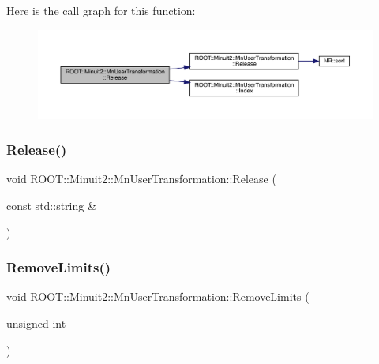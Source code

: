 Here is the call graph for this function\+:\nopagebreak
\begin{figure}[H]
\begin{center}
\leavevmode
\includegraphics[width=350pt]{d9/d98/classROOT_1_1Minuit2_1_1MnUserTransformation_ac9272ca2d514e879f59b0bb7dcbf9906_cgraph}
\end{center}
\end{figure}
\mbox{\label{classROOT_1_1Minuit2_1_1MnUserTransformation_ac9272ca2d514e879f59b0bb7dcbf9906}} 
\subsubsection{\texorpdfstring{Release()}{Release()}\hspace{0.1cm}{\footnotesize\ttfamily [4/4]}}
{\footnotesize\ttfamily void R\+O\+O\+T\+::\+Minuit2\+::\+Mn\+User\+Transformation\+::\+Release (\begin{DoxyParamCaption}\item[{const std\+::string \&}]{ }\end{DoxyParamCaption})}

\mbox{\label{classROOT_1_1Minuit2_1_1MnUserTransformation_aa7b791dee11011a7442e44c85c06d650}} 
\subsubsection{\texorpdfstring{RemoveLimits()}{RemoveLimits()}\hspace{0.1cm}{\footnotesize\ttfamily [1/4]}}
{\footnotesize\ttfamily void R\+O\+O\+T\+::\+Minuit2\+::\+Mn\+User\+Transformation\+::\+Remove\+Limits (\begin{DoxyParamCaption}\item[{unsigned int}]{ }\end{DoxyParamCaption})}

